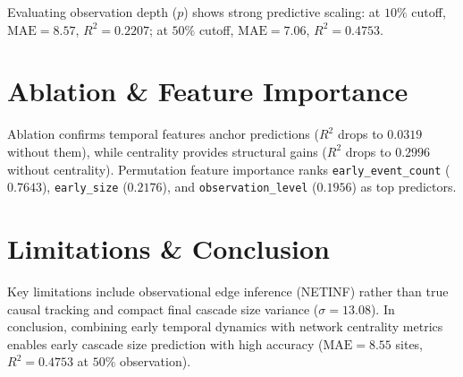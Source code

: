 \documentclass[10pt,journal,compsoc]{IEEEtran}
\begin{document}
Evaluating observation depth ($p$) shows strong predictive scaling: at $10\%$ cutoff, $\text{MAE} = 8.57$, $R^2 = 0.2207$; at $50\%$ cutoff, $\text{MAE} = 7.06$, $R^2 = \mathbf{0.4753}$.

\section{Ablation & Feature Importance}
Ablation confirms temporal features anchor predictions ($R^2$ drops to $0.0319$ without them), while centrality provides structural gains ($R^2$ drops to $0.2996$ without centrality). Permutation feature importance ranks \texttt{early\_event\_count} ($0.7643$), \texttt{early\_size} ($0.2176$), and \texttt{observation\_level} ($0.1956$) as top predictors.

\section{Limitations & Conclusion}
Key limitations include observational edge inference (NETINF) rather than true causal tracking and compact final cascade size variance ($\sigma=13.08$). In conclusion, combining early temporal dynamics with network centrality metrics enables early cascade size prediction with high accuracy ($\text{MAE} = 8.55$ sites, $R^2 = 0.4753$ at $50\%$ observation).



\end{document}
